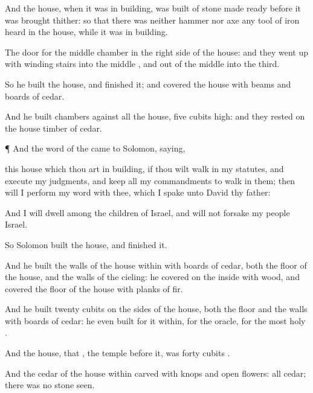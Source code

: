 {And the
house, when it was in
building, was
built of
stone made
ready before it was
brought thither: so that there was neither
hammer nor
axe
{} any
tool of
iron
heard in the
house, while it was in
building.

The
door for the
middle
chamber
{} in the
right
side of the
house: and they went
up with winding
stairs into the
middle
{}, and out of the
middle into the
third.

So he
built the
house, and
finished it; and
covered the
house with
beams and
boards of
cedar.

And
{} he
built
chambers against all the
house,
five
cubits
high: and they
rested on the
house
{}
timber of
cedar.


\par }{\PP {}¶ And the
word of the
{} came to
Solomon,
saying,

 this
house which thou art in
building, if thou wilt
walk in my
statutes, and
execute my
judgments, and
keep all my
commandments to
walk in them; then will I
perform my
word with thee, which I
spake unto
David thy
father:

And I will
dwell
among the
children of
Israel, and will not
forsake my
people
Israel.

So
Solomon
built the
house, and
finished it.


\par }{\PP {}And he
built the
walls of the
house
within with
boards of
cedar, both the
floor of the
house, and the
walls of the
cieling:
{} he
covered
{} on the
inside with
wood, and
covered the
floor of the
house with
planks of
fir.

And he
built
twenty
cubits on the
sides of the
house,
both the
floor and the
walls with
boards of
cedar: he even
built
{} for it
within,
{} for the
oracle,
{} for the
most
holy
{}.

And the
house, that
{}, the
temple
before it, was
forty
cubits
{}.

And the
cedar of the
house
within
{}
carved with
knops and
open
flowers: all
{}
cedar; there was no
stone
seen.

}
